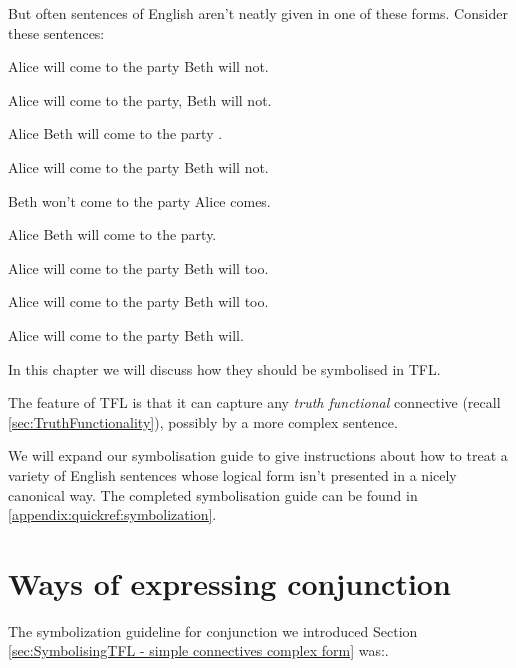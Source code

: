 But often sentences of English aren't neatly given in one of these forms. Consider these sentences:
\begin{compactlist}
	\item {} Alice will come to the party\mainconnective{,} Beth will not.  
	\item Alice will come to the party,  Beth will not.  
	\item {} Alice  Beth will come to the party .  
	\item {} Alice will come to the party\mainconnective{,} Beth will not.  
	\item Beth won't come to the party  Alice comes.
	\item {} Alice  Beth will come to the party.  
	\item Alice will come to the party  Beth will too.
	\item Alice will come to the party  Beth will too.
	\item Alice will come to the party  Beth will. 
\end{compactlist}

In this chapter we will discuss how they should be symbolised in TFL. 


The feature of TFL is that it can capture any \emph{truth functional} connective (recall \cref{sec:TruthFunctionality}), possibly by a more complex sentence. 

We will expand our symbolisation guide to give instructions about how to treat a variety of English sentences whose logical form isn't presented in a nicely canonical way. The completed symbolisation guide can be found in \cref{appendix:quickref:symbolization}. 


\section{Ways of expressing conjunction}
\label{sec:ConnectiveConjunction}

The symbolization guideline for conjunction we introduced Section \cref{sec:SymbolisingTFL - simple connectives complex form} was:.

